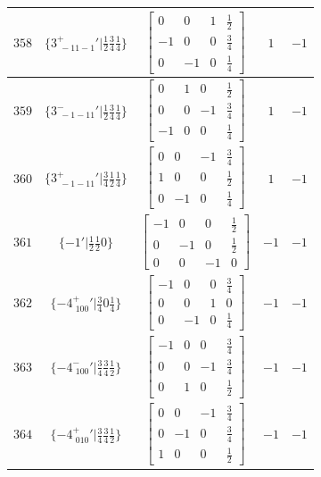 \documentclass[fleqn,8pt]{jsarticle}
\begin{document}
\begin{longtable}{ccccc}
$ 358 $ & $ \{3^{+}_{\,\,-11-1}{}'|\frac{1}{2} \frac{3}{4} \frac{1}{4}\} $ & $ \begin{bmatrix} 0 & 0 & 1 & \frac{1}{2} \\ -1 & 0 & 0 & \frac{3}{4} \\ 0 & -1 & 0 & \frac{1}{4} \end{bmatrix} $ & $ 1 $ & $ -1 $ \\ \hline
$ 359 $ & $ \{3^{-}_{\,\,-1-11}{}'|\frac{1}{2} \frac{3}{4} \frac{1}{4}\} $ & $ \begin{bmatrix} 0 & 1 & 0 & \frac{1}{2} \\ 0 & 0 & -1 & \frac{3}{4} \\ -1 & 0 & 0 & \frac{1}{4} \end{bmatrix} $ & $ 1 $ & $ -1 $ \\ \hline
$ 360 $ & $ \{3^{+}_{\,\,-1-11}{}'|\frac{3}{4} \frac{1}{2} \frac{1}{4}\} $ & $ \begin{bmatrix} 0 & 0 & -1 & \frac{3}{4} \\ 1 & 0 & 0 & \frac{1}{2} \\ 0 & -1 & 0 & \frac{1}{4} \end{bmatrix} $ & $ 1 $ & $ -1 $ \\ \hline
$ 361 $ & $ \{-1{}'|\frac{1}{2} \frac{1}{2} 0\} $ & $ \begin{bmatrix} -1 & 0 & 0 & \frac{1}{2} \\ 0 & -1 & 0 & \frac{1}{2} \\ 0 & 0 & -1 & 0 \end{bmatrix} $ & $ -1 $ & $ -1 $ \\ \hline
$ 362 $ & $ \{-4^{+}_{\,\,100}{}'|\frac{3}{4} 0 \frac{1}{4}\} $ & $ \begin{bmatrix} -1 & 0 & 0 & \frac{3}{4} \\ 0 & 0 & 1 & 0 \\ 0 & -1 & 0 & \frac{1}{4} \end{bmatrix} $ & $ -1 $ & $ -1 $ \\ \hline
$ 363 $ & $ \{-4^{-}_{\,\,100}{}'|\frac{3}{4} \frac{3}{4} \frac{1}{2}\} $ & $ \begin{bmatrix} -1 & 0 & 0 & \frac{3}{4} \\ 0 & 0 & -1 & \frac{3}{4} \\ 0 & 1 & 0 & \frac{1}{2} \end{bmatrix} $ & $ -1 $ & $ -1 $ \\ \hline
$ 364 $ & $ \{-4^{+}_{\,\,010}{}'|\frac{3}{4} \frac{3}{4} \frac{1}{2}\} $ & $ \begin{bmatrix} 0 & 0 & -1 & \frac{3}{4} \\ 0 & -1 & 0 & \frac{3}{4} \\ 1 & 0 & 0 & \frac{1}{2} \end{bmatrix} $ & $ -1 $ & $ -1 $ \\ \hline

\end{longtable}
\end{document}

